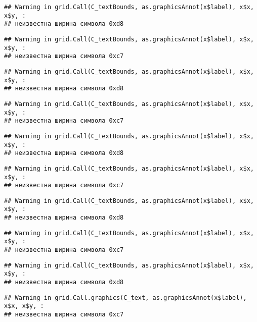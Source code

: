 \documentclass[
]{article}
\begin{document}
\begin{verbatim}
## Warning in grid.Call(C_textBounds, as.graphicsAnnot(x$label), x$x, x$y, :
## неизвестна ширина символа 0xd8
\end{verbatim}

\begin{verbatim}
## Warning in grid.Call(C_textBounds, as.graphicsAnnot(x$label), x$x, x$y, :
## неизвестна ширина символа 0xc7
\end{verbatim}

\begin{verbatim}
## Warning in grid.Call(C_textBounds, as.graphicsAnnot(x$label), x$x, x$y, :
## неизвестна ширина символа 0xd8
\end{verbatim}

\begin{verbatim}
## Warning in grid.Call(C_textBounds, as.graphicsAnnot(x$label), x$x, x$y, :
## неизвестна ширина символа 0xc7
\end{verbatim}

\begin{verbatim}
## Warning in grid.Call(C_textBounds, as.graphicsAnnot(x$label), x$x, x$y, :
## неизвестна ширина символа 0xd8
\end{verbatim}

\begin{verbatim}
## Warning in grid.Call(C_textBounds, as.graphicsAnnot(x$label), x$x, x$y, :
## неизвестна ширина символа 0xc7
\end{verbatim}

\begin{verbatim}
## Warning in grid.Call(C_textBounds, as.graphicsAnnot(x$label), x$x, x$y, :
## неизвестна ширина символа 0xd8
\end{verbatim}

\begin{verbatim}
## Warning in grid.Call(C_textBounds, as.graphicsAnnot(x$label), x$x, x$y, :
## неизвестна ширина символа 0xc7
\end{verbatim}

\begin{verbatim}
## Warning in grid.Call(C_textBounds, as.graphicsAnnot(x$label), x$x, x$y, :
## неизвестна ширина символа 0xd8
\end{verbatim}

\begin{verbatim}
## Warning in grid.Call.graphics(C_text, as.graphicsAnnot(x$label), x$x, x$y, :
## неизвестна ширина символа 0xc7
\end{verbatim}
\end{document}
